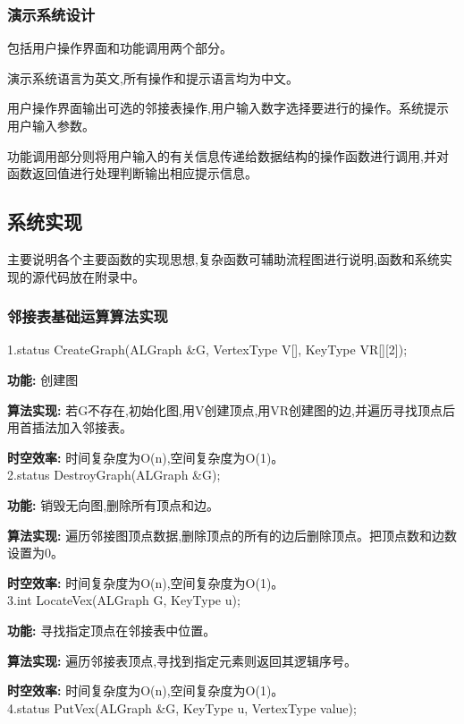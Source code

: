 \documentclass[supercite]{Experimental_Report}
\theoremstyle{definition}
\begin{document}
\subsubsection{演示系统设计}

包括用户操作界面和功能调用两个部分。

演示系统语言为英文,所有操作和提示语言均为中文。

用户操作界面输出可选的邻接表操作,用户输入数字选择要进行的操作。系统提示用户输入参数。

功能调用部分则将用户输入的有关信息传递给数据结构的操作函数进行调用,并对函数返回值进行处理判断输出相应提示信息。

\subsection{系统实现}

主要说明各个主要函数的实现思想,复杂函数可辅助流程图进行说明,函数和系统实现的源代码放在附录中。

\subsubsection{邻接表基础运算算法实现}

1.status CreateGraph(ALGraph \&G, VertexType V[], KeyType VR[][2]);

\textbf{功能: }创建图

\textbf{算法实现: }若G不存在,初始化图,用V创建顶点,用VR创建图的边,并遍历寻找顶点后用首插法加入邻接表。

\textbf{时空效率: }时间复杂度为O(n),空间复杂度为O(1)。\\

2.status DestroyGraph(ALGraph \&G);

\textbf{功能: }销毁无向图,删除所有顶点和边。

\textbf{算法实现: }遍历邻接图顶点数据,删除顶点的所有的边后删除顶点。把顶点数和边数设置为0。

\textbf{时空效率: }时间复杂度为O(n),空间复杂度为O(1)。\\

3.int LocateVex(ALGraph G, KeyType u);

\textbf{功能: }寻找指定顶点在邻接表中位置。

\textbf{算法实现: }遍历邻接表顶点,寻找到指定元素则返回其逻辑序号。

\textbf{时空效率: }时间复杂度为O(n),空间复杂度为O(1)。\\

4.status PutVex(ALGraph \&G, KeyType u, VertexType value);
\end{document}
